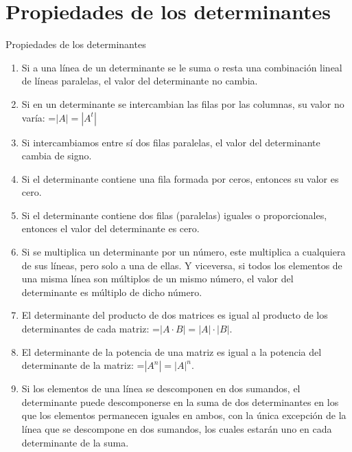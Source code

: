 \documentclass[11pt,a4paper]{article}
\newcommand{\fmm}[1]{\setbox0=\hbox{$#1$}\ifdim\wd0>\linewidth\fmdisp{#1}\else\mbox{\box0}\fi}
\newcommand{\fmdisp}[1]{\[\setbox2=\hbox{$\displaystyle #1$}\ifdim\wd2>\linewidth\resizebox{\linewidth}{!}{\box2}\else\box2\fi\]}
\begin{document}
\section{Propiedades de los determinantes}\hypertarget{sec4}{}

\begin{fmprop}{Propiedades de los determinantes}
\begin{enumerate}
\item Si a una línea de un determinante se le suma o resta una combinación lineal de líneas paralelas, el valor del determinante no cambia.
\item Si en un determinante se intercambian las filas por las columnas, su valor no varía: \fmm{|A|=|A^t|}
\item Si intercambiamos entre sí dos filas paralelas, el valor del determinante cambia de signo.
\item Si el determinante contiene una fila formada por ceros, entonces su valor es cero.
\item Si el determinante contiene dos filas (paralelas) iguales o proporcionales, entonces el valor del determinante es cero.
\item Si se multiplica un determinante por un número, este multiplica a cualquiera de sus líneas, pero solo a una de ellas. Y viceversa, si todos los elementos de una misma línea son múltiplos de un mismo número, el valor del determinante es múltiplo de dicho número.
\item El determinante del producto de dos matrices es igual al producto de los determinantes de cada matriz: \fmm{|A\cdot B|=|A|\cdot|B|}.
\item El determinante de la potencia de una matriz es igual a la potencia del determinante de la matriz: \fmm{|A^n|=|A|^n}.
\item Si los elementos de una línea se descomponen en dos sumandos, el determinante puede descomponerse en la suma de dos determinantes en los que los elementos permanecen iguales en ambos, con la única excepción de la línea que se descompone en dos sumandos, los cuales estarán uno en cada determinante de la suma.
\end{enumerate}
\end{fmprop}
\end{document}
